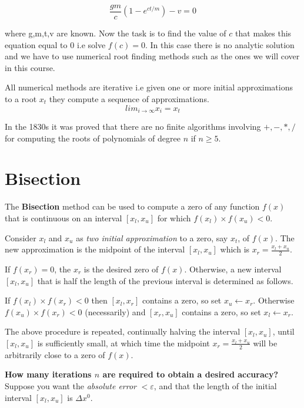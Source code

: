 \documentclass [titlepage,12pt,letter] {article}
\begin{document}
\begin{equation} 
\frac{gm}{c} (1-e^{ct/m}) - v = 0 
\end{equation} 

\noindent 
where g,m,t,v are known. Now the task is to find the value of $c$ that 
makes this equation equal to $0$ i.e solve $f(c) = 0$. In this case
there is no analytic solution and we have to use numerical root
finding methods such as the ones we will cover in this course. 

All numerical methods are iterative i.e given one or more initial
approximations to a root $x_t$ they compute a sequence of
approximations. 
\begin{equation} 
lim_{i \rightarrow \infty} x_{i} = x_{t} 
\end{equation} 

In the 1830s it was proved that there are no finite algorithms
involving $+,-,*,/$ for computing the roots of polynomials
of degree $n$ if $n \geq 5$. 


\section{Bisection} 

The {\bf Bisection} method can be used to compute a zero of any function $f(x)$ that is continuous on an interval $[x_l, x_u]$ for which $f(x_l) \times f(x_u) <0$.  

Consider $x_l$ and $x_u$ as {\it two initial approximation} to a zero, say $x_t$, of $f(x)$. The new approximation is the midpoint of the interval $[x_l, x_u]$ which is $x_r = \frac{x_l+x_u}{2}$.  

If $f(x_r) = 0$, the $x_r$ is the desired zero of $f(x)$. Otherwise, a new interval $[x_l, x_u]$ that is half the length of the previous interval is determined as follows. 

If $f(x_l) \times f(x_r)<0$ then $[x_l, x_r]$ contains a zero, so set $x_u \leftarrow x_r$. Otherwise $f(x_u) \times f(x_r) < 0$ (necessarily) and $[x_r, x_u]$ contains a zero, so set $x_l \leftarrow x_r$. 

The above procedure is repeated, continually halving the interval
$[x_l, x_u]$, until $[x_l, x_u]$ is sufficiently small, at which time
the midpoint $x_r = \frac{x_l+x_u}{2}$ will be arbitrarily close to a
zero of $f(x)$.

{\bf How many iterations $n$ are required to obtain a desired accuracy? } 
\\

Suppose you want the {\em absolute error} $< \varepsilon$, and that the length of the initial interval $[x_l, x_u]$ is $\Delta x^0$. 
\end{document}
